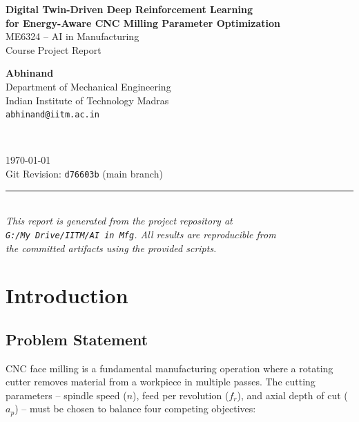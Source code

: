 \documentclass[11pt,a4paper]{article}
\begin{document}
\begin{titlepage}
    \centering
    \vspace*{2cm}

    {\LARGE \bfseries Digital Twin-Driven Deep Reinforcement Learning\\
    for Energy-Aware CNC Milling Parameter Optimization}\\[1.5cm]

    {\Large ME6324 -- AI in Manufacturing}\\[0.5cm]
    {\large Course Project Report}\\[2cm]

    \begin{minipage}{0.8\textwidth}
        \centering
        \large
        \textbf{Abhinand}\\
        Department of Mechanical Engineering\\
        Indian Institute of Technology Madras\\
        \texttt{abhinand@iitm.ac.in}
    \end{minipage}\\[2cm]

    \vfill

    {\large \today}\\[0.5cm]
    {\large Git Revision: \texttt{d76603b} (main branch)}

    \vspace{1cm}
    \rule{0.6\textwidth}{0.4pt}\\[0.5cm]
    {\small \textit{This report is generated from the project repository at\\
    \texttt{G:/My Drive/IITM/AI in Mfg}. All results are reproducible from\\
    the committed artifacts using the provided scripts.}}
\end{titlepage}

\tableofcontents
\newpage

\section{Introduction}

\subsection{Problem Statement}
CNC face milling is a fundamental manufacturing operation where a rotating cutter removes material from a workpiece in multiple passes. The cutting parameters -- spindle speed ($n$), feed per revolution ($f_r$), and axial depth of cut ($a_p$) -- must be chosen to balance four competing objectives:
\end{document}
